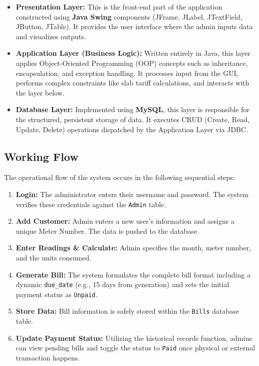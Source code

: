 \documentclass[a4paper,12pt]{article}
\begin{document}
\begin{itemize}
    \item \textbf{Presentation Layer:} This is the front-end part of the application constructed using \textbf{Java Swing} components (JFrame, JLabel, JTextField, JButton, JTable). It provides the user interface where the admin inputs data and visualizes outputs.
    \item \textbf{Application Layer (Business Logic):} Written entirely in Java, this layer applies Object-Oriented Programming (OOP) concepts such as inheritance, encapsulation, and exception handling. It processes input from the GUI, performs complex constraints like slab tariff calculations, and interacts with the layer below.
    \item \textbf{Database Layer:} Implemented using \textbf{MySQL}, this layer is responsible for the structured, persistent storage of data. It executes CRUD (Create, Read, Update, Delete) operations dispatched by the Application Layer via JDBC.
\end{itemize}

\subsection{Working Flow}
The operational flow of the system occurs in the following sequential steps:
\begin{enumerate}
    \item \textbf{Login:} The administrator enters their username and password. The system verifies these credentials against the \texttt{Admin} table.
    \item \textbf{Add Customer:} Admin enters a new user's information and assigns a unique Meter Number. The data is pushed to the database.
    \item \textbf{Enter Readings \& Calculate:} Admin specifies the month, meter number, and the units consumed.
    \item \textbf{Generate Bill:} The system formulates the complete bill format including a dynamic \texttt{due\_date} (e.g., 15 days from generation) and sets the initial payment status as \texttt{Unpaid}.
    \item \textbf{Store Data:} Bill information is safely stored within the \texttt{Bills} database table.
    \item \textbf{Update Payment Status:} Utilizing the historical records function, admins can view pending bills and toggle the status to \texttt{Paid} once physical or external transaction happens.
\end{enumerate}
\end{document}
